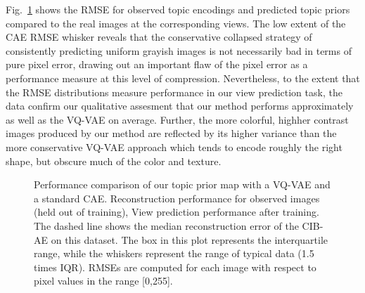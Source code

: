 Fig.~\ref{fig:vs_vqvae} shows the RMSE for observed topic encodings and predicted topic priors compared to the real images at the corresponding views. The low extent of the CAE RMSE whisker reveals that the conservative collapsed strategy of consistently predicting uniform grayish images is not necessarily bad in terms of pure pixel error, drawing out an important flaw of the pixel error as a performance measure at this level of compression. Nevertheless, to the extent that the RMSE distributions measure performance in our view prediction task, the data confirm our qualitative assesment that our method performs approximately as well as the VQ-VAE on average. Further, the more colorful, highher contrast images produced by our method are reflected by its higher variance than the more conservative VQ-VAE approach which tends to encode roughly the right shape, but obscure much of the color and texture.


\begin{figure}
    \begin{center}
    \end{center}
    \caption{ Performance comparison of our topic prior map with a VQ-VAE and a standard CAE.
    \protect{} Reconstruction performance for observed images (held out of training),
    \protect{} View prediction performance after training. The dashed line shows the median reconstruction error of the CIB-AE on this dataset. The box in this plot represents the interquartile range, while the whiskers represent the range of typical data (1.5 times IQR). RMSEs are computed for each image with respect to pixel values in the range [0,255].
    }
    \label{fig:vs_vqvae}
\end{figure}

